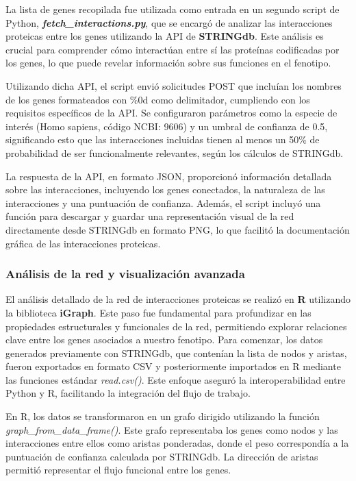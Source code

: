 La lista de genes recopilada fue utilizada como entrada en un segundo script de Python, \textbf{\textit{fetch\_interactions.py}}, que se encargó de analizar las interacciones proteicas entre los genes utilizando la API de \textbf{STRINGdb}. Este análisis es crucial para comprender cómo interactúan entre sí las proteínas codificadas por los genes, lo que puede revelar información sobre sus funciones en el fenotipo.

Utilizando dicha API, el script envió solicitudes POST que incluían los nombres de los genes formateados con \%0d como delimitador, cumpliendo con los requisitos específicos de la API. Se configuraron parámetros como la especie de interés (Homo sapiens, código NCBI: 9606) y un umbral de confianza de 0.5, significando esto que las interacciones incluidas tienen al menos un 50\% de probabilidad de ser funcionalmente relevantes, según los cálculos de STRINGdb.

La respuesta de la API, en formato JSON, proporcionó información detallada sobre las interacciones, incluyendo los genes conectados, la naturaleza de las interacciones y una puntuación de confianza. Además, el script incluyó una función para descargar y guardar una representación visual de la red directamente desde STRINGdb en formato PNG, lo que facilitó la documentación gráfica de las interacciones proteicas.

\subsubsection{\textbf{Análisis de la red y visualización avanzada}}

El análisis detallado de la red de interacciones proteicas se realizó en \textbf{R} utilizando la biblioteca \textbf{iGraph}. Este paso fue fundamental para profundizar en las propiedades estructurales y funcionales de la red, permitiendo explorar relaciones clave entre los genes asociados a nuestro fenotipo. Para comenzar, los datos generados previamente con STRINGdb, que contenían la lista de nodos y aristas, fueron exportados en formato CSV y posteriormente importados en R mediante las funciones estándar \textit{read.csv()}. Este enfoque aseguró la interoperabilidad entre Python y R, facilitando la integración del flujo de trabajo.

En R, los datos se transformaron en un grafo dirigido utilizando la función \textit{graph\_from\_data\_frame()}. Este grafo representaba los genes como nodos y las interacciones entre ellos como aristas ponderadas, donde el peso correspondía a la puntuación de confianza calculada por STRINGdb. La dirección de aristas permitió representar el flujo funcional entre los genes.

